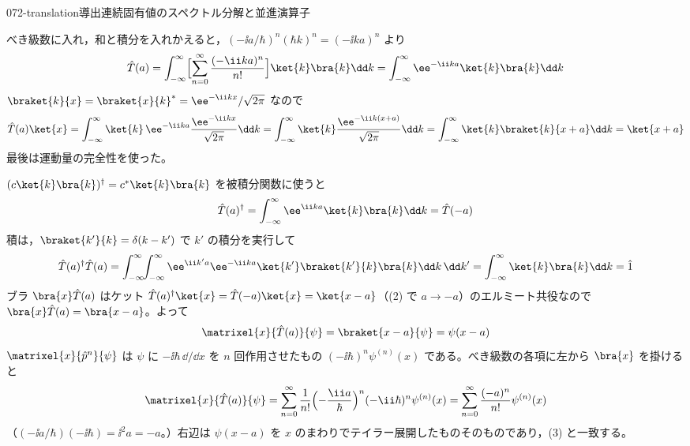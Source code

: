 \documentclass[uplatex,dvipdfmx,a4paper,11pt]{jsarticle}
\begin{document}
\begin{mondai}{072-translation}{導出}{連続固有値のスペクトル分解と並進演算子}
\begin{tadashii}
べき級数に入れ，和と積分を入れかえると，$(-\ii a/\hbar)^{n}(\hbar k)^{n}=(-\ii ka)^{n}$ より
\[ \hat{T}(a)=\int_{-\infty}^{\infty}\Bigl[\sum_{n=0}^{\infty}\frac{(-\ii ka)^{n}}{n!}\Bigr]\ket{k}\bra{k}\dd k=\int_{-\infty}^{\infty}\ee^{-\ii ka}\ket{k}\bra{k}\dd k \]
 $\braket{k}{x}=\braket{x}{k}^{*}=\ee^{-\ii kx}/\sqrt{2\pi}$ なので
\[ \hat{T}(a)\ket{x}=\int_{-\infty}^{\infty}\ket{k}\,\ee^{-\ii ka}\frac{\ee^{-\ii kx}}{\sqrt{2\pi}}\dd k=\int_{-\infty}^{\infty}\ket{k}\frac{\ee^{-\ii k(x+a)}}{\sqrt{2\pi}}\dd k=\int_{-\infty}^{\infty}\ket{k}\braket{k}{x+a}\dd k=\ket{x+a} \]
最後は運動量の完全性を使った。

 $(c\ket{k}\bra{k})^{\dagger}=c^{*}\ket{k}\bra{k}$ を被積分関数に使うと
\[ \hat{T}(a)^{\dagger}=\int_{-\infty}^{\infty}\ee^{\ii ka}\ket{k}\bra{k}\dd k=\hat{T}(-a) \]
積は，$\braket{k'}{k}=\delta(k-k')$ で $k'$ の積分を実行して
\[ \hat{T}(a)^{\dagger}\hat{T}(a)=\int_{-\infty}^{\infty}\!\!\int_{-\infty}^{\infty}\ee^{\ii k'a}\ee^{-\ii ka}\ket{k'}\braket{k'}{k}\bra{k}\dd k\,\dd k'=\int_{-\infty}^{\infty}\ket{k}\bra{k}\dd k=\hat{1} \]
ブラ $\bra{x}\hat{T}(a)$ はケット $\hat{T}(a)^{\dagger}\ket{x}=\hat{T}(-a)\ket{x}=\ket{x-a}$（(2) で $a\to-a$）のエルミート共役なので $\bra{x}\hat{T}(a)=\bra{x-a}$。よって
\[ \matrixel{x}{\hat{T}(a)}{\psi}=\braket{x-a}{\psi}=\psi(x-a) \]
 $\matrixel{x}{\hat{p}^{n}}{\psi}$ は $\psi$ に $-\ii\hbar\,\dd/\dd x$ を $n$ 回作用させたもの $(-\ii\hbar)^{n}\psi^{(n)}(x)$ である。べき級数の各項に左から $\bra{x}$ を掛けると
\[ \matrixel{x}{\hat{T}(a)}{\psi}=\sum_{n=0}^{\infty}\frac{1}{n!}\Bigl(-\frac{\ii a}{\hbar}\Bigr)^{n}(-\ii\hbar)^{n}\psi^{(n)}(x)=\sum_{n=0}^{\infty}\frac{(-a)^{n}}{n!}\psi^{(n)}(x) \]
（$(-\ii a/\hbar)(-\ii\hbar)=\ii^{2}a=-a$。）右辺は $\psi(x-a)$ を $x$ のまわりでテイラー展開したものそのものであり，(3) と一致する。


\end{tadashii}
\end{mondai}
\end{document}
